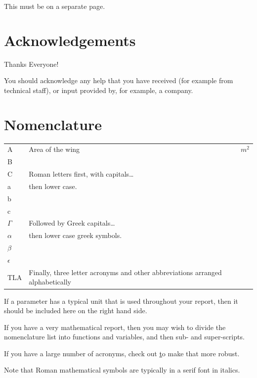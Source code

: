 \documentclass[a4paper,oneside,12pt]{book}
\numberwithin{equation}{chapter} %
\begin{document}
This must be on a separate page.

\newpage
\onehalfspacing\raggedright %

\section*{\Huge\textcolor{tcd_blue}{Acknowledgements}}
Thanks Everyone!

You should acknowledge any help that you have received (for example from technical staff), or input provided by, for example, a company.
\tableofcontents
\listoffigures
\listoftables
\newpage
\section*{\Huge\textcolor{tcd_blue}{Nomenclature}}
\begin{tabular}{lp{9cm}l}
A&Area of the wing&$m^{2}$\\
B\\
C& Roman letters first, with capitals\ldots\\
a&then lower case.\\
b\\
c\\
$\Gamma$&Followed by Greek capitals\ldots\\
$\alpha$&then lower case greek symbols.\\
$\beta$\\
$\epsilon$\\
TLA&Finally, three letter acronyms and other abbreviations arranged alphabetically\\
\end{tabular}
\vspace{2cm}

If a parameter has a typical unit that is used throughout your report, then it should be included here on the right hand side.

If you have a very mathematical report, then you may wish to divide the nomenclature list into functions and variables, and then sub- and super-scripts.

If you have a large number of acronyms, check out \href{https://www.overleaf.com/learn/latex/Glossaries} to make that more robust.

Note that Roman mathematical symbols are typically in a serif font in italics.

\mainmatter






%


\appendix
\renewcommand{\thechapter}{A\arabic{chapter}}

\end{document}
